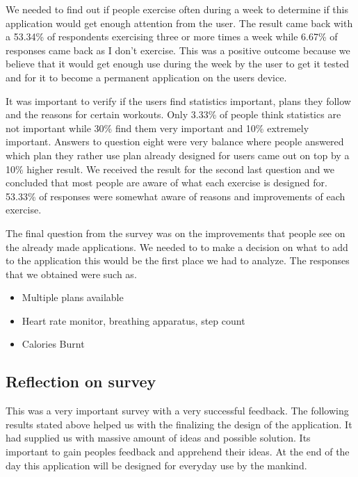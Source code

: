 \documentclass[a4paper,12pt]{report}
\begin{document}
We needed to find out if people exercise often during a week to determine if this application would get enough attention from the user.
The result came back with a 53.34\% of respondents exercising three or more times a week while 6.67\% of responses came back as I don't exercise. 
This was a positive outcome because we believe that it would get enough use during the week by the user to get it tested and for it to become a permanent application on the users device.

It was important to verify if the users find statistics important, plans they follow and the reasons for certain workouts.
Only 3.33\% of people think statistics are not important while 30\% find them very important and 10\% extremely important.
Answers to question eight were very balance where people answered which plan they rather use plan already designed for users came out on top by a 10\% higher result.
We received the result for the second last question and we concluded that most people are aware of what each exercise is designed for. 53.33\% of responses were somewhat aware of reasons and improvements of each exercise.

The final question from the survey was on the improvements that people see on the already made applications.
We needed to to make a decision on what to add to the application this would be the first place we had to analyze.
The responses that we obtained were such as.
\begin{itemize}
    \item  Multiple plans available
    \item Heart rate monitor, breathing apparatus, step count
    \item Calories Burnt 
\end{itemize}
   
\subsection{Reflection on survey} 
This was a very important survey with a very successful feedback. The following results stated above helped us with the finalizing the design of the application.
It had supplied us with massive amount of ideas and possible solution. Its important to gain peoples feedback and apprehend their ideas. At the end of the day this application will be designed for everyday use by the mankind.\\
\end{document}
